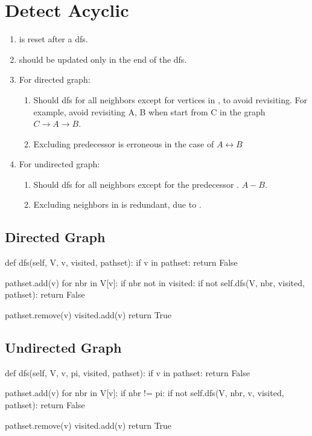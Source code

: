 \section{Detect Acyclic}
\begin{enumerate}
\item {} is reset after a dfs. 
\item {} should be updated only in the end of the dfs. 
\item For directed graph:
\begin{enumerate}
\item Should dfs for all neighbors except for vertices in , to avoid revisiting. For example, avoid revisiting A, B when start from C in the graph $C \rightarrow A \rightarrow B$.
\item Excluding predecessor  is erroneous in the case of $A \leftrightarrow B$ 
\end{enumerate}
\item For undirected graph:
\begin{enumerate}
\item Should dfs for all neighbors except for the predecessor . $A-B$.
\item Excluding neighbors in  is redundant, due to . 
\end{enumerate}
\end{enumerate}

\subsection{Directed Graph}

\begin{python}
def dfs(self, V, v, visited, pathset):
  if v in pathset:
    return False

  pathset.add(v)
  for nbr in V[v]:
    if nbr not in visited:
      if not self.dfs(V, nbr, visited, pathset):
        return False

  pathset.remove(v)
  visited.add(v)
  return True
\end{python}
\subsection{Undirected Graph}
\begin{python}
def dfs(self, V, v, pi, visited, pathset):
  if v in pathset:
    return False

  pathset.add(v)
  for nbr in V[v]:
    if nbr != pi:
      if not self.dfs(V, nbr, v, visited, pathset):
        return False

  pathset.remove(v)
  visited.add(v)
  return True
\end{python}

